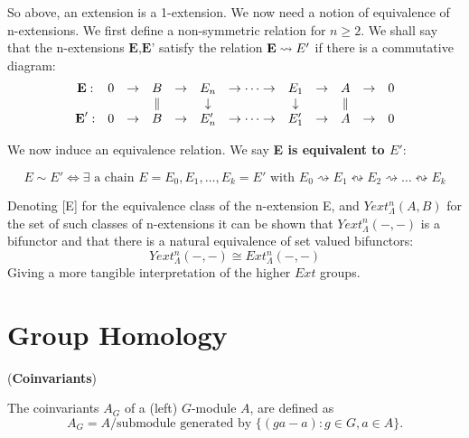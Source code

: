 So above, an extension is a 1-extension. We now need a notion of
equivalence of n-extensions. We first define a non-symmetric
relation for $n\geq 2$. We shall say that the n-extensions
$\textbf {E,E'}$ satisfy the relation $\textbf E \rightsquigarrow
E'$ if there is a commutative diagram:
$$\begin{array}{cccccccccccc}
  \textbf E :  & 0 & \rightarrow & B         & \rightarrow & E_n        & \rightarrow \dots \rightarrow & E_1        & \rightarrow & A & \rightarrow & 0 \\
               &   &             & \parallel &             & \downarrow &                               & \downarrow &             & \parallel &  &  \\
  \textbf E' : & 0 & \rightarrow & B         & \rightarrow & E'_n       & \rightarrow \dots \rightarrow & E'_1       & \rightarrow & A & \rightarrow & 0 \\
\end{array}$$

We now induce an equivalence relation. We say \textbf{E is
equivalent to $E'$}:

$$E \sim E' \Longleftrightarrow \exists \text{ a chain } E=E_0,
E_1, \dots , E_k = E' \text{ with } E_0\rightsquigarrow E_1
\leftrightsquigarrow E_2 \rightsquigarrow \dots
\leftrightsquigarrow E_k$$

Denoting [E] for the equivalence class of the n-extension E, and
$Yext^n_\Lambda (A,B)$ for the set of such classes of n-extensions
it can be shown that $Yext^n_\Lambda (-,-)$ is a bifunctor and
that there is a natural equivalence of set valued bifunctors:
$$Yext^n_\Lambda (-,-)\cong Ext^n_\Lambda (-,-)$$
Giving a more tangible interpretation of the higher $Ext$ groups.





\section{Group Homology} 



\begin{definition} (\textbf{Coinvariants})

The coinvariants $A_G$ of a (left) $G$-module $A$, are defined as
$$A_G  = A/\text{submodule generated by } \{ (ga-a): g\in G, a\in A\}.$$
\end{definition}


